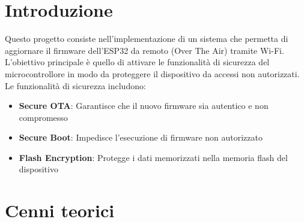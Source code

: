 \documentclass[a4paper]{article}
\begin{document}


\tableofcontents
\pagebreak

\section{Introduzione}
Questo progetto consiste nell'implementazione di un sistema che permetta di aggiornare
il firmware dell'ESP32 da remoto (Over The Air) tramite Wi-Fi. L'obiettivo principale è
quello di attivare le funzionalità di sicurezza del microcontrollore in modo da proteggere
il dispositivo da accessi non autorizzati. Le funzionalità di sicurezza includono:
\begin{itemize}
  \item \textbf{Secure OTA}: Garantisce che il nuovo firmware sia autentico e non
    compromesso
  \item \textbf{Secure Boot}: Impedisce l'esecuzione di firmware non autorizzato
  \item \textbf{Flash Encryption}: Protegge i dati memorizzati nella memoria flash
    del dispositivo
\end{itemize}


\section{Cenni teorici}
\end{document}
